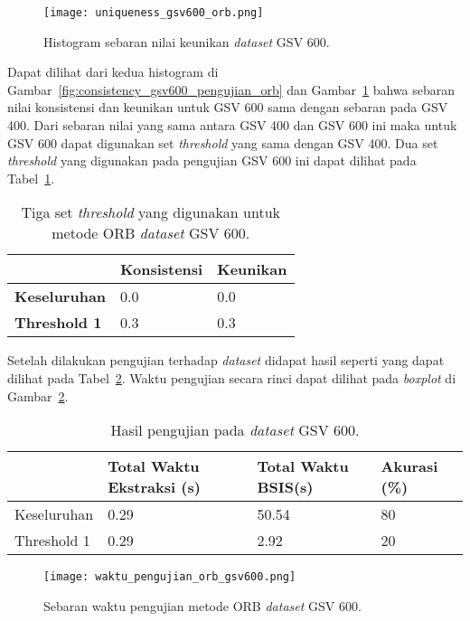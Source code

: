 \begin{figure}[H]
	\centering
	\texttt{[image: uniqueness\_gsv600\_orb.png]}
	\caption{Histogram sebaran nilai keunikan \textit{dataset} GSV 600.}
	\label{fig:uniqueness_gsv600_pengujian_orb}
\end{figure}
Dapat dilihat dari kedua histogram di Gambar~\ref{fig:consistency_gsv600_pengujian_orb} dan Gambar~\ref{fig:uniqueness_gsv600_pengujian_orb} bahwa sebaran nilai konsistensi dan keunikan untuk GSV 600 sama dengan sebaran pada GSV 400. Dari sebaran nilai yang sama antara GSV 400 dan GSV 600 ini maka untuk GSV 600 dapat digunakan set \textit{threshold} yang sama dengan GSV 400. Dua set \textit{threshold} yang digunakan pada pengujian GSV 600 ini dapat dilihat pada Tabel~\ref{tab:threshold_gsv600_orb}.
\begin{table}[H]
	\centering
	\begin{tabular}{|l|l|l|}
		\hline
		& \textbf{Konsistensi} & \textbf{Keunikan} \\ \hline
		\textbf{Keseluruhan} & 0.0                  & 0.0               \\ \hline
		\textbf{Threshold 1} & 0.3                  & 0.3               \\ \hline
	\end{tabular}
	\caption{Tiga set \textit{threshold} yang digunakan untuk metode ORB \textit{dataset} GSV 600.}
	\label{tab:threshold_gsv600_orb}
\end{table}
Setelah dilakukan pengujian terhadap \textit{dataset} didapat hasil seperti yang dapat dilihat pada Tabel~\ref{tab:pengujian_orb_gsv600}. Waktu pengujian secara rinci dapat dilihat pada \textit{boxplot} di Gambar~\ref{fig:waktu_pengujian_orb_gsv600}. 
\begin{table}[H]
	\centering
	\begin{tabular}{|l|l|l|l|}
		\hline
		& \textbf{Total Waktu Ekstraksi (s)} & \textbf{Total Waktu BSIS(s)} & \textbf{Akurasi (\%)} \\ \hline
		Keseluruhan & 0.29 & 50.54                   & 80                    \\ \hline
		Threshold 1 & 0.29 & 2.92                    & 20                    \\ \hline
	\end{tabular}
	\caption{Hasil pengujian pada \textit{dataset} GSV 600.}
	\label{tab:pengujian_orb_gsv600}
\end{table}
\begin{figure}[H]
	\centering
	\texttt{[image: waktu\_pengujian\_orb\_gsv600.png]}
	\caption{Sebaran waktu pengujian metode ORB \textit{dataset} GSV 600.}
	\label{fig:waktu_pengujian_orb_gsv600}
\end{figure}

